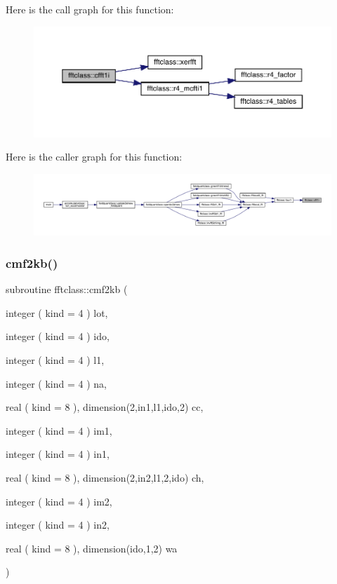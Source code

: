 Here is the call graph for this function\+:\nopagebreak
\begin{figure}[H]
\begin{center}
\leavevmode
\includegraphics[width=350pt]{namespacefftclass_a7aaa42c1b45fc7175f2560cd023e4487_cgraph}
\end{center}
\end{figure}
Here is the caller graph for this function\+:\nopagebreak
\begin{figure}[H]
\begin{center}
\leavevmode
\includegraphics[width=350pt]{namespacefftclass_a7aaa42c1b45fc7175f2560cd023e4487_icgraph}
\end{center}
\end{figure}
\mbox{\label{namespacefftclass_a718a5d0ac7052a9bcbcb9db18430dd61}} 
\subsubsection{\texorpdfstring{cmf2kb()}{cmf2kb()}}
{\footnotesize\ttfamily subroutine fftclass\+::cmf2kb (\begin{DoxyParamCaption}\item[{integer ( kind = 4 )}]{lot,  }\item[{integer ( kind = 4 )}]{ido,  }\item[{integer ( kind = 4 )}]{l1,  }\item[{integer ( kind = 4 )}]{na,  }\item[{real ( kind = 8 ), dimension(2,in1,l1,ido,2)}]{cc,  }\item[{integer ( kind = 4 )}]{im1,  }\item[{integer ( kind = 4 )}]{in1,  }\item[{real ( kind = 8 ), dimension(2,in2,l1,2,ido)}]{ch,  }\item[{integer ( kind = 4 )}]{im2,  }\item[{integer ( kind = 4 )}]{in2,  }\item[{real ( kind = 8 ), dimension(ido,1,2)}]{wa }\end{DoxyParamCaption})}

